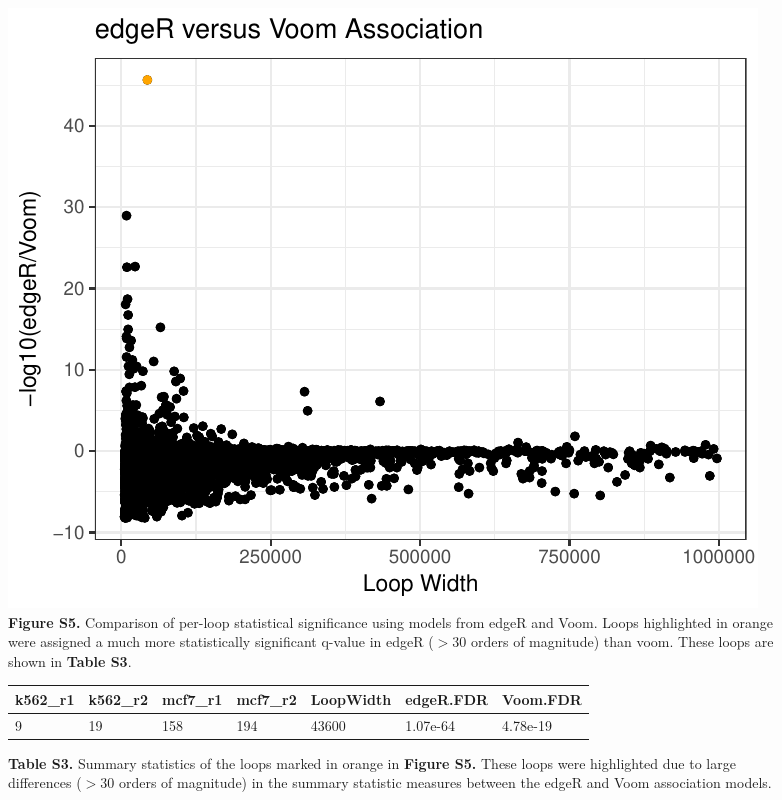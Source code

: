 \documentclass{article}\usepackage[]{graphicx}\usepackage[]{color}
\makeatletter
\def\maxwidth{ %
  \ifdim\Gin@nat@width>\linewidth
    \linewidth
  \else
    \Gin@nat@width
  \fi
}
\newenvironment{knitrout}{}{} %
\makeatother
\begin{document}
\begin{figure}[h]
\begin{knitrout}
\color{fgcolor}

{\centering \includegraphics[width=\maxwidth]{figure/evv-1} 

}



\end{knitrout}
\centering
\caption{\textbf{Figure S5.} Comparison of per-loop statistical significance using models from edgeR and Voom. Loops highlighted in orange were assigned a much more statistically significant q-value in edgeR ($> 30$ orders of magnitude) than voom. These loops are shown in \textbf{Table S3}.}
\end{figure}

\begin{figure}[h]
\begin{knitrout}
\color{fgcolor}
\begin{tabular}{l|l|l|l|l|l|l}
\hline
k562\_r1 & k562\_r2 & mcf7\_r1 & mcf7\_r2 & LoopWidth & edgeR.FDR & Voom.FDR\\
\hline
9 & 19 & 158 & 194 & 43600 & 1.07e-64 & 4.78e-19\\
\hline
\end{tabular}


\end{knitrout}
\centering
\caption{\textbf{Table S3.} Summary statistics of the loops marked in orange in \textbf{Figure S5.} These loops were highlighted due to large differences ($> 30$ orders of magnitude) in the summary statistic measures between the edgeR and Voom association models.}
\end{figure}  \clearpage 
\end{document}
